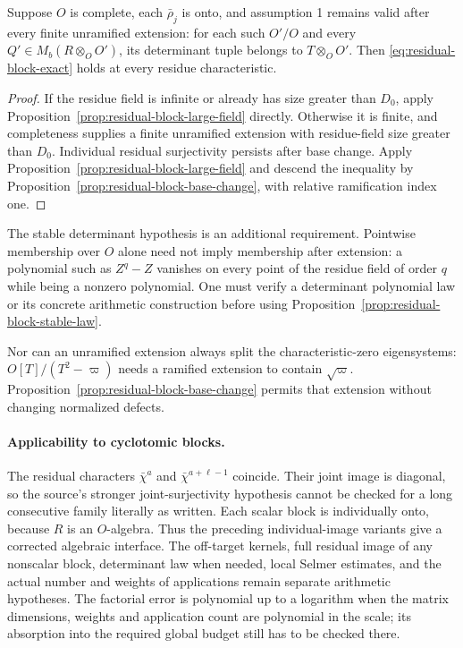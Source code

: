 \begin{proposition}
\label{prop:residual-block-stable-law}
Suppose $O$ is complete, each $\bar\rho_j$ is onto, and assumption 1
remains valid after every finite unramified extension: for each such
$O'/O$ and every $Q'\in M_b(R\otimes_OO')$, its determinant tuple
belongs to $T\otimes_OO'$. Then
\eqref{eq:residual-block-exact} holds at every residue characteristic.
\end{proposition}
\begin{proof}
If the residue field is infinite or already has size greater than
$D_0$, apply Proposition~\ref{prop:residual-block-large-field}
directly. Otherwise it is finite, and completeness supplies a
finite unramified extension with residue-field size greater than
$D_0$. Individual residual surjectivity persists
after base change. Apply
Proposition~\ref{prop:residual-block-large-field} and descend the
inequality by Proposition~\ref{prop:residual-block-base-change},
with relative ramification index one.
\end{proof}

The stable determinant hypothesis is an additional requirement.
Pointwise membership over $O$ alone need not imply membership
after extension: a polynomial such as $Z^q-Z$ vanishes on every
point of the residue field of order $q$ while being a nonzero
polynomial. One must verify a determinant polynomial law or its
concrete arithmetic construction before using
Proposition~\ref{prop:residual-block-stable-law}.

Nor can an unramified extension always split the characteristic-zero
eigensystems: $O[T]/(T^2-\varpi)$ needs a ramified extension to
contain $\sqrt\varpi$. Proposition~\ref{prop:residual-block-base-change}
permits that extension without changing normalized defects.

\paragraph{Applicability to cyclotomic blocks.}
The residual characters $\bar\chi^a$ and $\bar\chi^{a+\ell-1}$
coincide. Their joint image is diagonal, so the source's stronger
joint-surjectivity hypothesis cannot be checked for a long
consecutive family literally as written. Each scalar block is
individually onto, because $R$ is an $O$-algebra. Thus the preceding
individual-image variants give a corrected algebraic interface.
The off-target kernels, full residual image of any nonscalar block,
determinant law when needed, local Selmer estimates, and the actual
number and weights of applications remain separate arithmetic
hypotheses. The factorial error is polynomial up to a logarithm
when the matrix dimensions, weights and application count are
polynomial in the scale; its absorption into the required global
budget still has to be checked there.
